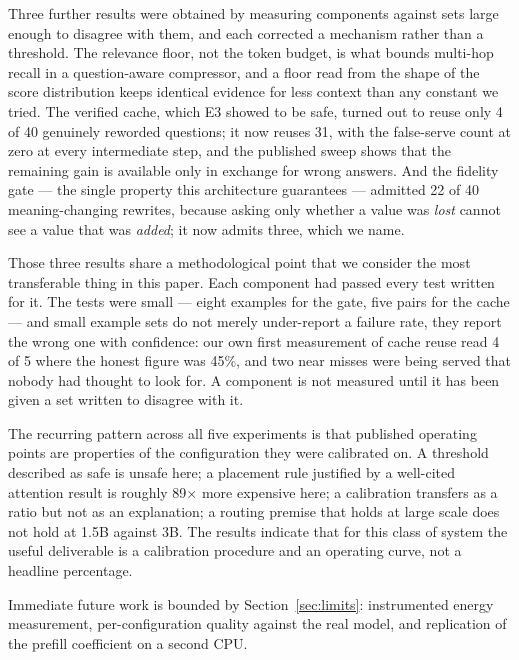 \documentclass[11pt,a4paper]{article}
\begin{document}
Three further results were obtained by measuring components against sets large
enough to disagree with them, and each corrected a mechanism rather than a
threshold. The relevance floor, not the token budget, is what bounds multi-hop
recall in a question-aware compressor, and a floor read from the shape of the
score distribution keeps identical evidence for less context than any constant
we tried. The verified cache, which E3 showed to be safe, turned out to reuse
only 4 of 40 genuinely reworded questions; it now reuses 31, with the
false-serve count at zero at every intermediate step, and the published sweep
shows that the remaining gain is available only in exchange for wrong answers.
And the fidelity gate --- the single property this architecture guarantees ---
admitted 22 of 40 meaning-changing rewrites, because asking only whether a value
was \emph{lost} cannot see a value that was \emph{added}; it now admits three,
which we name.

Those three results share a methodological point that we consider the most
transferable thing in this paper. Each component had passed every test written
for it. The tests were small --- eight examples for the gate, five pairs for the
cache --- and small example sets do not merely under-report a failure rate, they
report the wrong one with confidence: our own first measurement of cache reuse
read 4 of 5 where the honest figure was 45\%, and two near misses were being
served that nobody had thought to look for. A component is not measured until it
has been given a set written to disagree with it.

The recurring pattern across all five experiments is that published operating
points are properties of the configuration they were calibrated on. A threshold
described as safe is unsafe here; a placement rule justified by a well-cited
attention result is roughly 89$\times$ more expensive here; a calibration
transfers as a ratio but not as an explanation; a routing premise that holds at
large scale does not hold at 1.5B against 3B. The results indicate that for this
class of system the useful deliverable is a calibration procedure and an operating
curve, not a headline percentage.

Immediate future work is bounded by Section~\ref{sec:limits}: instrumented energy
measurement, per-configuration quality against the real model, and replication of
the prefill coefficient on a second CPU.
\end{document}
